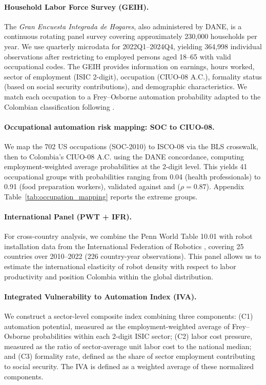 \documentclass[5p,times,authoryear]{elsarticle}
\begin{document}
\paragraph{Household Labor Force Survey (GEIH).} The \textit{Gran Encuesta Integrada de Hogares}, also administered by DANE, is a continuous rotating panel survey covering approximately 230,000 households per year. We use quarterly microdata for 2022Q1--2024Q4, yielding 364,998 individual observations after restricting to employed persons aged 18--65 with valid occupational codes. The GEIH provides information on earnings, hours worked, sector of employment (ISIC 2-digit), occupation (CIUO-08 A.C.), formality status (based on social security contributions), and demographic characteristics. We match each occupation to a Frey--Osborne automation probability adapted to the Colombian classification following \citet{morales2023risk}.

\paragraph{Occupational automation risk mapping: SOC to CIUO-08.} We map the 702 \citet{frey2017future} US occupations (SOC-2010) to ISCO-08 via the BLS crosswalk, then to Colombia's CIUO-08 A.C. using the DANE concordance, computing employment-weighted average probabilities at the 2-digit level. This yields 41 occupational groups with probabilities ranging from 0.04 (health professionals) to 0.91 (food preparation workers), validated against \citet{arntz2016} and \citet{gmyrek2023generative} ($\rho = 0.87$). Appendix Table~\ref{tab:occupation_mapping} reports the extreme groups.

\paragraph{International Panel (PWT + IFR).} For cross-country analysis, we combine the Penn World Table 10.01 with robot installation data from the International Federation of Robotics \citep{ifr2024}, covering 25 countries over 2010--2022 (226 country-year observations). This panel allows us to estimate the international elasticity of robot density with respect to labor productivity and position Colombia within the global distribution.

\paragraph{Integrated Vulnerability to Automation Index (IVA).} We construct a sector-level composite index combining three components: (C1) automation potential, measured as the employment-weighted average of Frey--Osborne probabilities within each 2-digit ISIC sector; (C2) labor cost pressure, measured as the ratio of sector-average unit labor cost to the national median; and (C3) formality rate, defined as the share of sector employment contributing to social security. The IVA is defined as a weighted average of these normalized components.
\end{document}
